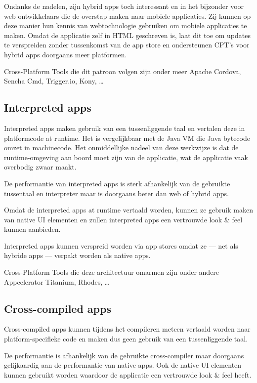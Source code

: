 \documentclass[a4paper,conference]{IEEEconf}
\begin{document}
Ondanks de nadelen, zijn hybrid apps toch interessant en in het bijzonder voor web ontwikkelaars die de overstap maken naar mobiele applicaties. Zij kunnen op deze manier hun kennis van webtochnologie gebruiken om mobiele applicaties te maken. Omdat de applicatie zelf in HTML geschreven is, laat dit toe om updates te verspreiden zonder tussenkomst van de app store en ondersteunen CPT's voor hybrid apps doorgaans meer platformen.

Cross-Platform Tools die dit patroon volgen zijn onder meer Apache Cordova, Sencha Cmd, Trigger.io, Kony, \ldots

\subsection{Interpreted apps}

Interpreted apps maken gebruik van een tussenliggende taal en vertalen deze in platformcode at runtime. Het is vergelijkbaar met de Java VM die Java bytecode omzet in machinecode. Het onmiddellijke nadeel van deze werkwijze is dat de runtime-omgeving aan boord moet zijn van de applicatie, wat de applicatie vaak overbodig zwaar maakt.

De performantie van interpreted apps is sterk afhankelijk van de gebruikte tussentaal en interpreter maar is doorgaans beter dan web of hybrid apps.

Omdat de interpreted apps at runtime vertaald worden, kunnen ze gebruik maken van native UI elementen en zullen interpreted apps een vertrouwde look \& feel kunnen aanbieden. 

Interpreted apps kunnen verspreid worden via app stores omdat ze --- net als hybride apps --- verpakt worden als native apps. 
 
Cross-Platform Tools die deze architectuur omarmen zijn onder andere Appcelerator Titanium, Rhodes, \ldots

\subsection{Cross-compiled apps}

Cross-compiled apps kunnen tijdens het compileren meteen vertaald worden naar platform-specifieke code en maken dus geen gebruik van een tussenliggende taal. 

De performantie is afhankelijk van de gebruikte cross-compiler maar doorgaans gelijkaardig aan de performantie van native apps. Ook de native UI elementen kunnen gebruikt worden waardoor de applicatie een vertrouwde look \& feel heeft.
\end{document}
